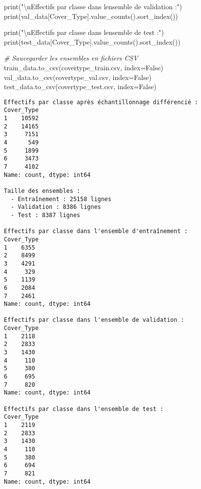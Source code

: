 \documentclass[
  letterpaper,
  DIV=11,
  numbers=noendperiod]{scrartcl}
\newenvironment{Shaded}{}{}
\newcommand{\BuiltInTok}[1]{\textcolor[rgb]{0.00,0.50,0.00}{#1}}
\newcommand{\CharTok}[1]{\textcolor[rgb]{0.25,0.44,0.63}{#1}}
\newcommand{\CommentTok}[1]{\textcolor[rgb]{0.38,0.63,0.69}{\textit{#1}}}
\newcommand{\NormalTok}[1]{#1}
\newcommand{\OperatorTok}[1]{\textcolor[rgb]{0.40,0.40,0.40}{#1}}
\newcommand{\StringTok}[1]{\textcolor[rgb]{0.25,0.44,0.63}{#1}}
\newcommand{\VariableTok}[1]{\textcolor[rgb]{0.10,0.09,0.49}{#1}}
\begin{document}
\begin{Shaded}
\begin{Highlighting}[]
\BuiltInTok{print}\NormalTok{(}\StringTok{"}\CharTok{\textbackslash{}n}\StringTok{Effectifs par classe dans l\textquotesingle{}ensemble de validation :"}\NormalTok{)}
\BuiltInTok{print}\NormalTok{(val\_data[}\StringTok{\textquotesingle{}Cover\_Type\textquotesingle{}}\NormalTok{].value\_counts().sort\_index())}

\BuiltInTok{print}\NormalTok{(}\StringTok{"}\CharTok{\textbackslash{}n}\StringTok{Effectifs par classe dans l\textquotesingle{}ensemble de test :"}\NormalTok{)}
\BuiltInTok{print}\NormalTok{(test\_data[}\StringTok{\textquotesingle{}Cover\_Type\textquotesingle{}}\NormalTok{].value\_counts().sort\_index())}

\CommentTok{\# Sauvegarder les ensembles en fichiers CSV}
\NormalTok{train\_data.to\_csv(}\StringTok{\textquotesingle{}covertype\_train.csv\textquotesingle{}}\NormalTok{, index}\OperatorTok{=}\VariableTok{False}\NormalTok{)}
\NormalTok{val\_data.to\_csv(}\StringTok{\textquotesingle{}covertype\_val.csv\textquotesingle{}}\NormalTok{, index}\OperatorTok{=}\VariableTok{False}\NormalTok{)}
\NormalTok{test\_data.to\_csv(}\StringTok{\textquotesingle{}covertype\_test.csv\textquotesingle{}}\NormalTok{, index}\OperatorTok{=}\VariableTok{False}\NormalTok{)}
\end{Highlighting}
\end{Shaded}

\begin{verbatim}
Effectifs par classe après échantillonnage différencié :
Cover_Type
1    10592
2    14165
3     7151
4      549
5     1899
6     3473
7     4102
Name: count, dtype: int64

Taille des ensembles :
  - Entraînement : 25158 lignes
  - Validation : 8386 lignes
  - Test : 8387 lignes

Effectifs par classe dans l'ensemble d'entraînement :
Cover_Type
1    6355
2    8499
3    4291
4     329
5    1139
6    2084
7    2461
Name: count, dtype: int64

Effectifs par classe dans l'ensemble de validation :
Cover_Type
1    2118
2    2833
3    1430
4     110
5     380
6     695
7     820
Name: count, dtype: int64

Effectifs par classe dans l'ensemble de test :
Cover_Type
1    2119
2    2833
3    1430
4     110
5     380
6     694
7     821
Name: count, dtype: int64
\end{verbatim}
\end{document}
